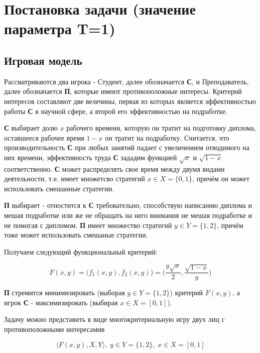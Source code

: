 \section{Постановка задачи (значение параметра T=1)}

\subsection{Игровая модель}

\qquad Рассматриваются два игрока - Студент, далее обозначается \textbf{С},
и Преподаватель, далее обозначается \textbf{П}, которые имеют противоположные интересы.
Критерий интересов составляют две велечины, первая из которых является эффективностью
работы \textbf{С} в научной сфере, а второй его эффективностью на подработке.

\textbf{С} выбирает долю $x$ рабочего времени, которую он тратит на подготовку
диплома, оставшееся рабочее время $1-x$ он тратит на подработку. Считается, что производительность \textbf{С} при любых занятий падает с увеличением 
отводимого на них времени, эффективность труда \textbf{С} зададим функцией $\sqrt{x}$
и $\sqrt{1-x}$ соответственно. \textbf{С} может распределять свое время между двумя 
видами деятельности, т.е. имеет множетсво стратегий $x\in X = \{0, 1\}$, 
причём он может использовать смешанные стратегии.

\textbf{П} выбирает - отностится к \textbf{С} требовательно, способствую 
написанию диплома и мешая подработке или же не обращать на него внимания не 
мешая подработке и не помогая с дипломом. \textbf{П} имеет множество стратегий 
$y \in Y=\{1, 2\}$, причём тоже может использовать смешаные стратегии.

\vspace{5mm}
Получаем следующий функциональный критерий:

\begin{equation}
	F(x, y)=
	\big(f_1(x,y), f_2(x,y)\big) =
	\Big(
		\frac{y\sqrt{x}}2,
		\frac{\sqrt{1-x}}y
	\Big)
	\label{eq:player_criterion}
\end{equation}

\qquad \textbf{П} стремится минимизировать (выборая $y \in Y = \{1,2\}$)
критерий $F(x, y)$, а игрок \textbf{С} - максимизировать
 (выбирая $x \in X=[0,1]$).

\vspace{5mm} 
Задачу можно представить в виде многокритериальную игру двух лиц 
с противоположными интересамив 

\begin{equation}
	\bigg \langle F(x,y), X, Y \bigg \rangle, \; y \in Y=\{1, 2\}, \; x \in {X}=[0, 1]
	\label{eq:mc_game}
\end{equation}


